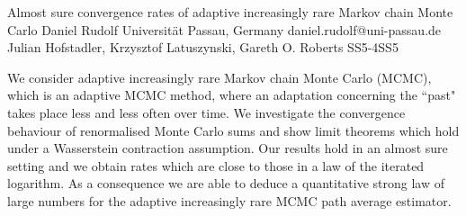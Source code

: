 \begin{talk}
  {Almost sure convergence rates of adaptive increasingly rare Markov chain Monte Carlo}%
  {Daniel Rudolf}%
  {Universit\"at Passau, Germany}%
  {daniel.rudolf@uni-passau.de}%
  {Julian Hofstadler, Krzysztof Latuszynski, Gareth O. Roberts}%
{}{}{SS5-4}{SS5}

			

We consider adaptive increasingly rare Markov chain Monte Carlo (MCMC), which is an adaptive MCMC method, where an adaptation concerning the ``past" takes place less and less often over time. We investigate the convergence behaviour of renormalised Monte Carlo sums and show limit theorems which hold under a Wasserstein contraction assumption. Our results hold in an almost sure setting and we obtain rates which are close to those in a law of the iterated logarithm. As a consequence we are able to deduce a quantitative strong law of large numbers for the adaptive increasingly rare MCMC path average estimator.

\medskip

%
\end{talk}

